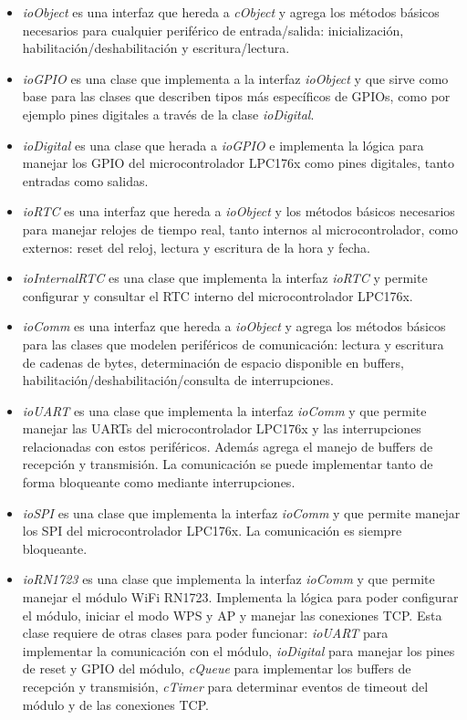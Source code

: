 \begin{itemize}
\item \textit{ioObject} es una interfaz que hereda a \textit{cObject} y agrega los métodos básicos necesarios para cualquier periférico de entrada/salida: inicialización, habilitación/deshabilitación y escritura/lectura.

\item \textit{ioGPIO} es una clase que implementa a la interfaz \textit{ioObject} y que sirve como base para las clases que describen tipos más específicos de GPIOs, como por ejemplo pines digitales a través de la clase \textit{ioDigital}.

\item \textit{ioDigital} es una clase que herada a \textit{ioGPIO} e implementa la lógica para manejar los GPIO del microcontrolador LPC176x como pines digitales, tanto entradas como salidas.

\item \textit{ioRTC} es una interfaz que hereda a \textit{ioObject} y los métodos básicos necesarios para manejar relojes de tiempo real, tanto internos al microcontrolador, como externos: reset del reloj, lectura y escritura de la hora y fecha.

\item \textit{ioInternalRTC} es una clase que implementa la interfaz \textit{ioRTC} y permite configurar y consultar el RTC interno del microcontrolador LPC176x.

\item \textit{ioComm} es una interfaz que hereda a \textit{ioObject} y agrega los métodos básicos para las clases que modelen periféricos de comunicación: lectura y escritura de cadenas de bytes, determinación de espacio disponible en buffers, habilitación/deshabilitación/consulta de interrupciones.

\item \textit{ioUART} es una clase que implementa la interfaz \textit{ioComm} y que permite manejar las UARTs del microcontrolador LPC176x y las interrupciones relacionadas con estos periféricos. Además agrega el manejo de buffers de recepción y transmisión. La comunicación se puede implementar tanto de forma bloqueante como mediante interrupciones.

\item \textit{ioSPI} es una clase que implementa la interfaz \textit{ioComm} y que permite manejar los SPI del microcontrolador LPC176x. La comunicación es siempre bloqueante.

\item \textit{ioRN1723} es una clase que implementa la interfaz \textit{ioComm} y que permite manejar el módulo WiFi RN1723. Implementa la lógica para poder configurar el módulo, iniciar el modo WPS y AP y manejar las conexiones TCP. Esta clase requiere de otras clases para poder funcionar: \textit{ioUART} para implementar la comunicación con el módulo, \textit{ioDigital} para manejar los pines de reset y GPIO del módulo, \textit{cQueue} para implementar los buffers de recepción y transmisión, \textit{cTimer} para determinar eventos de timeout del módulo y de las conexiones TCP.


\end{itemize}
